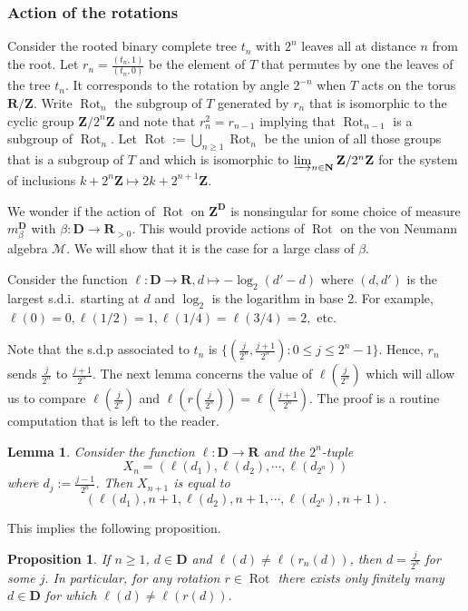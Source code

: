\documentclass[a4paper,12pt]{amsart}
\numberwithin{equation}{section}
\newtheorem{lemma}[theo]{Lemma}
\newtheorem{prop}[theo]{Proposition}
\theoremstyle{definition}
\newcommand{\D}{\mathbf D}
\newcommand{\scrM}{\mathscr M}
\newcommand{\mbD}{m_\beta^\D}
\newcommand{\N}{\mathbf{N}}
\newcommand{\R}{\mathbf{R}}
\DeclareMathOperator{\Rot}{Rot}
\newcommand{\Z}{\mathbf{Z}}
\begin{document}
\subsubsection{Action of the rotations}\label{sec:rotact}
Consider the rooted binary complete tree $t_n$ with $2^n$ leaves all at distance $n$ from the root.
Let $r_n=\tfrac{(t_n,1)}{(t_n,0)}$ be the element of $T$ that permutes by one the leaves of the tree $t_n$.
It corresponds to the rotation by angle $2^{-n}$ when $T$ acts on the torus $\R/\Z.$
Write $\Rot_n$ the subgroup of $T$ generated by $r_n$ that is isomorphic to the cyclic group $\Z/ 2^n\Z$ and note that $r_n^2 =r_{n-1}$ implying that $\Rot_{n-1}$ is a subgroup of $\Rot_n.$
Let $\Rot:=\bigcup_{n\geq 1}\Rot_n$ be the union of all those groups that is a subgroup of $T$ and which is isomorphic to $\varinjlim_{n\in\N} \Z/ 2^n\Z$ for the system of inclusions $k+2^n\Z \mapsto 2k+2^{n+1}\Z$.

We wonder if the action of $\Rot$ on $\Z^\D$ is nonsingular for some choice of measure $\mbD$ with $\beta:\D\to\R_{>0}$.  This would provide actions of $\Rot$ on the von Neumann algebra $\scrM$.
We will show that it is the case for a large class of $\beta$.

Consider the function $\ell:\D\to \R, d\mapsto -\log_2(d'-d)$ where $(d,d')$ is the largest s.d.i.~starting at $d$ and $\log_2$ is the logarithm in base 2.
For example, $\ell(0)=0, \ell(1/2)=1, \ell(1/4)=\ell(3/4)=2,$ etc.

Note that the s.d.p associated to $t_n$ is $\{(\tfrac{j}{2^n},\tfrac{j+1}{2^n}) : 0\leq j \leq 2^n-1\}$.
Hence, $r_n$ sends $\tfrac{j}{2^n}$ to $\tfrac{j+1}{2^n}.$
The next lemma concerns the value of $\ell(\tfrac{j}{2^n})$ which will allow us to compare $\ell(\tfrac{j}{2^n})$ and $\ell(r(\tfrac{j}{2^n}))=\ell(\tfrac{j+1}{2^n}).$ 
The proof is a routine computation that is left to the reader.

\begin{lemma}\label{lem:ell-function}
Consider the function $\ell:\D\to \R$ and the $2^n$-tuple 
$$X_n=(\ell(d_1), \ell(d_2),\cdots, \ell(d_{2^n}))$$ where $d_j:=\tfrac{j-1}{2^n}$.
Then $X_{n+1}$ is equal to $$(\ell(d_1) , n+1 , \ell(d_2), n+1 , \cdots, \ell(d_{2^n}), n+1 ).$$
\end{lemma}

This implies the following proposition.

\begin{prop}
If $n\geq 1$, $d\in\D$ and $\ell(d)\neq \ell(r_n(d))$, then $d=\tfrac{j}{2^n}$ for some $j.$ 
In particular, for any rotation $r\in \Rot$ there exists only finitely many $d\in\D$ for which $\ell(d)\neq \ell(r(d)).$
\end{prop}
\end{document}
